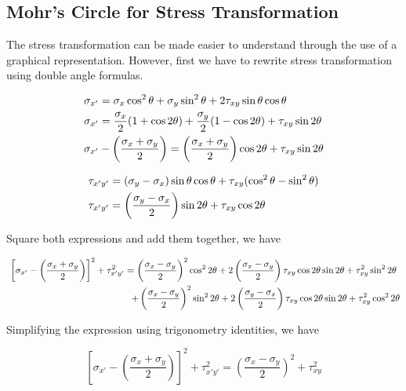 \documentclass[a4paper,openany,12pt]{book}
\begin{document}
\subsection{Mohr's Circle for Stress Transformation}
\label{sec:orgb89f95a}
The stress transformation can be made easier to understand through the
use of a graphical representation. However, first we have to rewrite
stress transformation using double angle formulas.

$$\begin{gathered}
  \sigma_{x'} = \sigma_x\cos^2\theta  + \sigma_y\sin^2\theta  + 2\tau_{xy}\sin \theta \cos \theta  \hfill \\
  \sigma _{x'} = \frac{\sigma_x}{2}(1 + \cos 2\theta ) + \frac{\sigma_y}{2}(1 - \cos 2\theta ) + {\tau_{xy}}\sin 2\theta  \hfill \\
  \sigma_{x'} - \left( \frac{\sigma_x + \sigma_y}{2} \right) = \left( \frac{\sigma_x + \sigma_y}{2} \right)\cos 2\theta  + {\tau_{xy}}\sin 2\theta  \hfill \\ 
\end{gathered}$$

$$\begin{gathered}
  \tau_{x'y'} = (\sigma_y - \sigma_x)\sin \theta \cos \theta  + \tau_{xy}(\cos^2\theta  - \sin^2\theta ) \\
  \tau_{x'y'} = \left( \frac{\sigma_y - \sigma_x}{2} \right)\sin 2\theta  + \tau _{xy}\cos 2\theta \hfill \\ 
\end{gathered}$$

Square both expressions and add them together, we have

$$\begin{gathered}
    \left[ \sigma_{x'} - \left( \frac{\sigma_x + \sigma_y}{2} \right) \right]^2 + \tau_{x'y'}^2 = \left( \frac{\sigma_x - \sigma_y}{2} \right)^2\cos^2 2\theta  + 2\left( \frac{\sigma_x - \sigma_y}{2} \right)\tau_{xy}\cos 2\theta \sin 2\theta  + \tau_{xy}^2\sin^2 2\theta \\
    \hspace{4.7cm} + \left( \frac{\sigma_x - \sigma_y}{2} \right)^2 \sin^2 2\theta  + 2\left( \frac{\sigma_y - \sigma_x}{2} \right)\tau_{xy}\cos 2\theta \sin 2\theta  + \tau_{xy}^2\cos^2 2\theta \\ 
\end{gathered}$$

Simplifying the expression using trigonometry identities, we have

$$\left[ \sigma_{x'} - \left( \frac{\sigma_x + \sigma_y}{2} \right) \right]^2 + \tau_{x'y'}^2 = \left( \frac{\sigma_x - \sigma_y}{2} \right)^2 + \tau_{xy}^2$$
\end{document}
